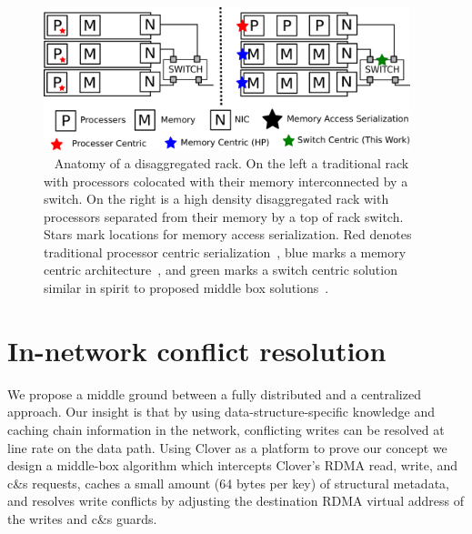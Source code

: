 \begin{figure}
      \centering
      \includegraphics[width=0.95\textwidth]{fig/overview.png}
      \caption{~
      Anatomy of a disaggregated rack. On the left a
      traditional rack with processors colocated with their memory
      interconnected by a switch. On the right is a high density
      disaggregated rack with processors separated from their memory
      by a top of rack switch. Stars mark locations for memory access
      serialization. Red denotes traditional processor centric
      serialization~\cite{memc3, cell, sonuma, storm, clover}, blue marks a
      memory centric architecture~\cite{aguilera2019designing}, and
      green marks a switch centric solution similar in spirit to
      proposed middle box solutions~\cite{254120}.
      \label{fig:overview}
      }
\end{figure}

\section{In-network conflict resolution}

We propose a middle ground between a fully distributed and a
centralized approach.  Our insight is that by using
data-structure-specific knowledge and caching chain information in the
network, conflicting writes can be resolved at line rate on the data
path.  Using Clover as a platform to prove our concept we design a
middle-box algorithm which intercepts Clover's RDMA read,
write, and c\&s requests, caches a small amount (64 bytes per key) of
structural metadata, and resolves write conflicts by adjusting the
destination RDMA virtual address of the writes and c\&s guards.


